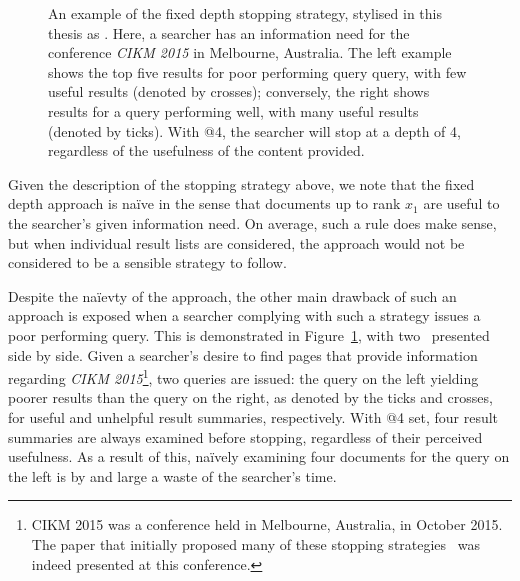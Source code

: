 \begin{figure}[t!]
    \centering
    \caption[Examples of the fixed depth stopping strategy, ]{An example of the fixed depth stopping strategy, stylised in this thesis as . Here, a searcher has an information need for the conference \emph{CIKM 2015} in Melbourne, Australia. The left example shows the top five results for poor performing query query, with few useful results (denoted by {\color{dmax_red}crosses}); conversely, the right shows results for a query performing well, with many useful results (denoted by {\color{dmax_green}ticks}). With  @4, the searcher will stop at a depth of 4, regardless of the usefulness of the content provided.}
    \label{fig:ss1}
\end{figure}

Given the description of the stopping strategy above, we note that the fixed depth approach is na\"{i}ve in the sense that documents up to rank $x_1$ are useful to the searcher's given information need. On average, such a rule does make sense, but when individual result lists are considered, the approach would not be considered to be a sensible strategy to follow.

Despite the na\"{i}evty of the approach, the other main drawback of such an approach is exposed when a searcher complying with such a strategy issues a poor performing query. This is demonstrated in Figure~\ref{fig:ss1}, with two~ presented side by side. Given a searcher's desire to find pages that provide information regarding \emph{CIKM 2015}\footnote{CIKM 2015 was a conference held in Melbourne, Australia, in October 2015. The paper that initially proposed many of these stopping strategies~\cite{maxwell2015stopping_strategies} was indeed presented at this conference.}, two queries are issued: the query on the left yielding poorer results than the query on the right, as denoted by the ticks and crosses, for useful and unhelpful result summaries, respectively. With  @4 set, four result summaries are always examined before stopping, regardless of their perceived usefulness. As a result of this, na\"{i}vely examining four documents for the query on the left is by and large a waste of the searcher's time.

